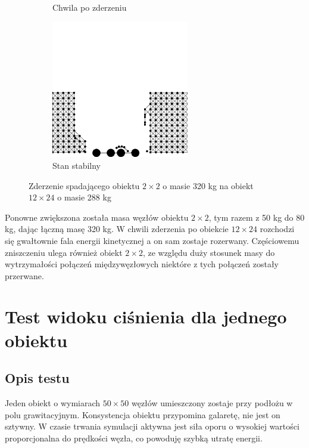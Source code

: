 \documentclass[12pt, letterpaper]{report}
\begin{document}
\begin{figure}[h]
\begin{subfigure}{0.5\textwidth}
            \caption{Chwila po zderzeniu}
        \end{subfigure}
        \begin{subfigure}{0.5\textwidth}
            \centering
            \includegraphics[width=6cm, height=6cm]{collision_2x2_24x12_mass80_4}
            \caption{Stan stabilny}
        \end{subfigure}
        
        \caption{Zderzenie spadającego obiektu $2 \times 2$ o masie 320 kg na obiekt $12 \times 24$ o masie 288 kg}
    \end{figure}

    Ponowne zwiększona została masa węzłów obiektu $2 \times 2$, tym razem z 50 kg do 80 kg, dając łączną masę 320 kg.
    W chwili zderzenia po obiekcie $12 \times 24$ rozchodzi się gwałtownie fala energii kinetycznej a on sam zostaje 
    rozerwany. Częściowemu zniszczeniu ulega również obiekt $2 \times 2$, ze względu duży stosunek masy do wytrzymałości
    połączeń międzywęzłowych niektóre z tych połączeń zostały przerwane.

    \newpage
    \section{Test widoku ciśnienia dla jednego obiektu}
    \subsection{Opis testu}
    Jeden obiekt o wymiarach $50 \times 50$ węzłów umieszczony zostaje przy podłożu w polu grawitacyjnym.
    Konsystencja obiektu przypomina galaretę, nie jest on sztywny. W czasie trwania symulacji 
    aktywna jest siła oporu o wysokiej wartości proporcjonalna do prędkości węzła, co powoduję szybką 
    utratę energii.
\end{document}
